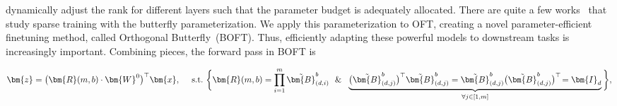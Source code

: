 \cite{zhang2022adaptive,valipour2022dylora,zhang2023increlora} dynamically adjust the rank for different layers such that the parameter budget is adequately allocated. There are quite a few works~\cite{dao2019learning,dao2019kaleidoscope,chen2022pixelated,dao2022monarch} that study sparse training with the butterfly parameterization. We apply this parameterization to OFT, creating  a novel parameter-efficient finetuning method, called Orthogonal Butterfly~(BOFT). Thus, efficiently adapting these powerful models to downstream tasks is increasingly important. Combining pieces, the forward pass in BOFT is

\begin{equation}
    \begin{aligned}\nonumber
    \bm{z}=\big(\bm{R}(m,b)\cdot\bm{W}^0\big)^\top\bm{x},~~~~\text{s.t.}~\bigg{\{}\bm{R}(m,b)=\prod_{i=1}^m \tilde{\bm{B}}^b_{(d,i)}~~\&~~\underbrace{\big(\tilde{\bm{B}}^b_{(d,j)}\big)^\top\tilde{\bm{B}}^b_{(d,j)}=\tilde{\bm{B}}^b_{(d,j)}\big(\tilde{\bm{B}}^b_{(d,j)}\big)^\top\!=\bm{I}_d}_{\forall j\in [1, m]}\bigg{\}},
    \end{aligned}
\end{equation}

